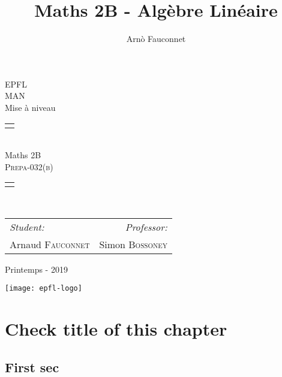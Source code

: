 \documentclass[
    11pt,
    a4paper,
    oneside,
    headinlcude, footinclude,
    twoside,
]{report}
\title{Maths 2B - Algèbre Linéaire}
\author{Arn\`o Fauconnet}
\begin{document}
\begin{titlepage}
   \begin{center}
       \vspace*{\fill}

       {\Huge EPFL}\\ 
       \vfill
       {\huge MAN}\\ [1em]
       {\Large Mise à niveau}\\
        \vfill
        \begin{tabularx}{\textwidth}{X}
            \Xhline{3\arrayrulewidth}\\
        \end{tabularx}\\ [2em]
        {\Huge Maths 2B} \\ [1em]
        \textsc{\huge Prepa-032(b)} \\ [2em]
        \begin{tabularx}{\textwidth}{X}
            \Xhline{3\arrayrulewidth}\\
        \end{tabularx}\\ [2em]
        \vspace{.7cm}
        {\large
        \begin{tabularx}{.9\textwidth}{Xr}
            \textit{Student:} & \textit{Professor:}\\
            Arnaud \textsc{Fauconnet} & Simon \textsc{Bossoney}
        \end{tabularx}}
        \vfill
        {\Large Printemps - 2019}

        \vfill
        \texttt{[image: epfl-logo]}

       \vfill
   \end{center} 
\end{titlepage} 
\setcounter{chapter}{1}
\chapter{Check title of this chapter}
\label{cha:check_title_of_this_chapter}

\section{First sec }
\label{sec:first_sec}
\end{document}
